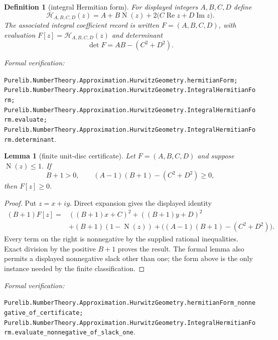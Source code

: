 \documentclass[11pt]{article}
\newtheorem{lemma}[lemma]{Lemma}
\newtheorem{definition}[definition]{Definition}
\newcommand{\Norm}[1]{\operatorname{N}\!\left(#1\right)}
\newcommand{\leanref}[1]{\par\smallskip\noindent
  \emph{Formal verification:}\par\nobreak
  {\raggedright\nolinkurl{#1}.\par}}
\begin{document}
\begin{definition}[integral Hermitian form]
\label{def:integral-hermitian-form}
For displayed integers $A,B,C,D$ define
\begin{equation}
\label{eq:integral-hermitian-form}
 \mathcal H_{A,B,C,D}(z)
   =A+B\Norm z+2\bigl(C\operatorname{Re}z+D\operatorname{Im}z\bigr).
\end{equation}
The associated integral coefficient record is written $F=(A,B,C,D)$, with
evaluation $F[z]=\mathcal H_{A,B,C,D}(z)$ and determinant
\begin{equation}
\label{eq:hermitian-determinant}
                             \det F=AB-(C^2+D^2).
\end{equation}
\end{definition}

\leanref{Purelib.NumberTheory.Approximation.HurwitzGeometry.hermitianForm;
Purelib.NumberTheory.Approximation.HurwitzGeometry.IntegralHermitianForm;
Purelib.NumberTheory.Approximation.HurwitzGeometry.IntegralHermitianForm.evaluate;
Purelib.NumberTheory.Approximation.HurwitzGeometry.IntegralHermitianForm.determinant}

\begin{lemma}[finite unit-disc certificate]
\label{lem:hermitian-slack-certificate}
Let $F=(A,B,C,D)$ and suppose $\Norm z\le1$.  If
\begin{equation}
\label{eq:slack-one-certificate}
                  B+1>0,
 \qquad (A-1)(B+1)-(C^2+D^2)\ge0,
\end{equation}
then $F[z]\ge0$.
\end{lemma}

\begin{proof}
Put $z=x+iy$.  Direct expansion gives the displayed identity
\begin{align*}
 (B+1)F[z]
   ={}&((B+1)x+C)^2+((B+1)y+D)^2\\
     &+(B+1)(1-\Norm z)
       +\bigl((A-1)(B+1)-(C^2+D^2)\bigr).
\end{align*}
Every term on the right is nonnegative by the supplied rational
inequalities.  Exact division by the positive $B+1$ proves the result.  The
formal lemma also permits a displayed nonnegative slack other than one; the
form above is the only instance needed by the finite classification.
\end{proof}

\leanref{Purelib.NumberTheory.Approximation.HurwitzGeometry.hermitianForm_nonnegative_of_certificate;
Purelib.NumberTheory.Approximation.HurwitzGeometry.IntegralHermitianForm.evaluate_nonnegative_of_slack_one}
\end{document}
